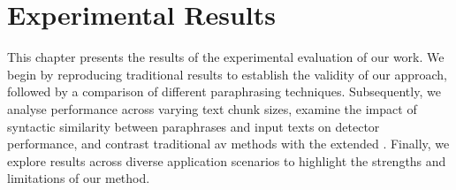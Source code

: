 \chapter{Experimental Results}
\label{chap:experimental_results}

This chapter presents the results of the experimental evaluation of our work. 
We begin by reproducing traditional results to establish the validity of our approach, followed by a comparison of different paraphrasing techniques. 
Subsequently, we analyse performance across varying text chunk sizes, examine the impact of syntactic similarity between paraphrases and input texts on detector performance, and contrast traditional \ac{av} methods with the extended \impAppr{}. 
Finally, we explore results across diverse application scenarios to highlight the strengths and limitations of our method. 












